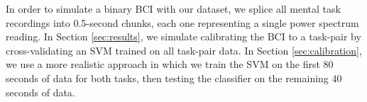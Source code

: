 
In order to simulate a binary BCI with our dataset, we splice all mental task recordings into 0.5-second chunks, each one representing a single power spectrum reading. In Section \ref{sec:results}, we simulate calibrating the BCI to a task-pair by cross-validating an SVM trained on all task-pair data. In Section \ref{sec:calibration}, we use a more realistic approach in which we train the SVM on the first 80 seconds of data for both tasks, then testing the classifier on the remaining 40 seconds of data.



